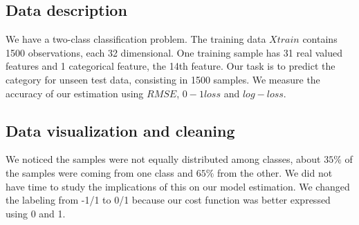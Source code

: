 \subsection{Data description}
We have a two-class classification problem. The training data $Xtrain$ contains 1500 observations, each 32 dimensional. One training sample has 31 real valued features and 1 categorical feature, the 14th feature. Our task is to predict the category for unseen test data, consisting in 1500 samples. We measure the accuracy of our estimation using $RMSE$, $0-1 loss$ and $log-loss$. 

\subsection{Data visualization and cleaning}
We noticed the samples were not equally distributed among classes, about $35\%$ of the samples were coming from one class and $65\%$ from the other. We did not have time to study the implications of this on our model estimation. We changed the labeling from -1/1 to 0/1 because our cost function was better expressed using 0 and 1.

